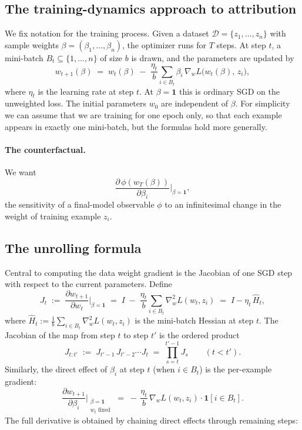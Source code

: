 \documentclass[11pt]{article}
\begin{document}
\subsection{The training-dynamics approach to attribution}\label{subsec:unroll-motivation}

We fix notation for the training process. Given a dataset $\mathcal{D} = \{z_1,\dots,z_n\}$ with sample weights $\beta = (\beta_1,\dots,\beta_n)$, the optimizer runs for $T$ steps. At step $t$, a mini-batch $B_t \subseteq \{1,\dots,n\}$ of size $b$ is drawn, and the parameters are updated by
\begin{equation}\label{eq:sgd-update}
  w_{t+1}(\beta) \;=\; w_t(\beta) \;-\; \frac{\eta_t}{b}\sum_{i\in B_t}\beta_i\,\nabla_w L\bigl(w_t(\beta),\,z_i\bigr),
\end{equation}
where $\eta_t$ is the learning rate at step $t$. At $\beta = \mathbf{1}$ this is ordinary SGD on the unweighted loss. The initial parameters $w_0$ are independent of $\beta$.
For simplicity we can assume that we are training for one epoch only, so that each example appears in exactly one mini-batch, but the formulas hold more generally.

\paragraph{The counterfactual.} We want
\[
  \frac{\partial\,\phi(w_T(\beta))}{\partial \beta_i}\bigg\rvert_{\beta=\mathbf{1}},
\]
the sensitivity of a final-model observable $\phi$ to an infinitesimal change in the weight of training example $z_i$. 
\subsection{The unrolling formula}\label{subsec:unroll-formula}

Central to computing the data weight gradient is the Jacobian of one SGD step with respect to the current parameters. Define
\begin{equation}\label{eq:step-jacobian}
  J_t \;:=\; \frac{\partial w_{t+1}}{\partial w_t}\bigg\rvert_{\beta=\mathbf{1}} \;=\; I \;-\; \frac{\eta_t}{b}\sum_{i\in B_t}\nabla_w^2 L(w_t,z_i) \;=\; I - \eta_t\,\widehat{H}_t,
\end{equation}
where $\widehat{H}_t := \tfrac{1}{b}\sum_{i\in B_t}\nabla_w^2 L(w_t,z_i)$ is the mini-batch Hessian at step $t$. The Jacobian of the map from step $t$ to step $t'$ is the ordered product
\begin{equation}\label{eq:chained-jacobian}
  J_{t:t'} \;:=\; J_{t'-1}\,J_{t'-2}\cdots J_{t} \;=\; \prod_{s=t}^{t'-1} J_s \qquad (t < t').
\end{equation}
Similarly, the direct effect of $\beta_i$ at step $t$ (when $i\in B_t$) is the per-example gradient:
\begin{equation}\label{eq:direct-effect}
  \frac{\partial w_{t+1}}{\partial \beta_i}\bigg\rvert_{\substack{\beta=\mathbf{1}\\w_t\text{ fixed}}} \;=\; -\,\frac{\eta_t}{b}\,\nabla_w L(w_t,z_i) \cdot \mathbf{1}[i\in B_t].
\end{equation}
The full derivative is obtained by chaining direct effects through remaining steps:
\end{document}
